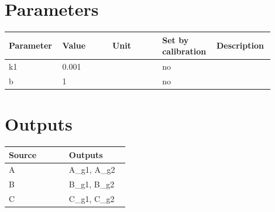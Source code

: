 \documentclass{article}
\begin{document}
\section*{Parameters}
\begin{longtable}{p{0.18\linewidth}p{0.18\linewidth}p{0.18\linewidth}p{0.18\linewidth}p{0.18\linewidth}}
Parameter & Value & Unit & Set by calibration & Description \\
\hline
\endhead
k1 & 0.001 &  & no &  \\
b & 1 &  & no &  \\
\end{longtable}
\section*{Outputs}
\begin{longtable}{p{0.45\linewidth}p{0.45\linewidth}}
Source & Outputs \\
\hline
\endhead
A & A\_g1, A\_g2 \\
B & B\_g1, B\_g2 \\
C & C\_g1, C\_g2 \\
\end{longtable}
\end{document}
